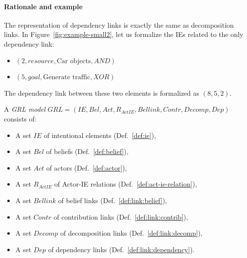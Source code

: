\paragraph{Rationale and example} The representation of dependency links is exactly the same as decomposition links. In Figure~\ref{fig:example-small2}, let us formalize the IEs related to the only dependency link:
\begin{itemize}
\item $(2, resource, \text{Car objects}, AND)$
\item $(5, goal, \text{Generate traffic}, XOR)$
\end{itemize}

The dependency link between these two elements is formalized as $(8, 5, 2)$.

\begin{definition}
\label{def:grl-model}
A \emph{GRL model} $GRL=(IE, Bel, Act, R_{ActIE}, Bellink, Contr, Decomp, Dep)$ consists of:
\begin{itemize}
\item A set $IE$ of intentional elements (Def.~\ref{def:ie}),
\item A set $Bel$ of beliefs (Def.~\ref{def:belief}),
\item A set $Act$ of actors (Def.~\ref{def:actor}),
\item A set $R_{ActIE}$ of Actor-IE relations (Def.~\ref{def:act-ie-relation}),
\item A set $Bellink$ of belief links (Def.~\ref{def:link:belief}),
\item A set $Contr$ of contribution links (Def.~\ref{def:link:contrib}),
\item A set $Decomp$ of decomposition links (Def.~\ref{def:link:decomp}),
\item A set $Dep$ of dependency links (Def.~\ref{def:link:dependency}).
\end{itemize}
\end{definition}

